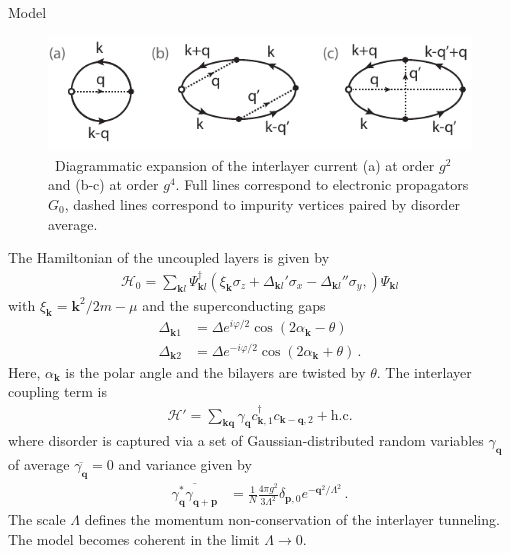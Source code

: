 \documentclass[final]{beamer}
\newlength{\onecolwid}
\begin{document}
\begin{frame}[t]
\begin{columns}[t]
\begin{column}{\onecolwid}
\begin{block}{Model}
\begin{figure}
\includegraphics[width=\linewidth]{fig/diagram-figure.pdf}
\caption{\sffamily \,
Diagrammatic expansion of the interlayer current (a) at order $g^2$ and (b-c) at
order $g^4$. Full lines correspond to electronic propagators $G_0$, dashed
lines correspond to impurity vertices paired by disorder average.}
\label{fig:diagram}
\end{figure}

The Hamiltonian of the uncoupled layers is given by
\begin{align}
	\mathcal{H}_0 = \sum_{\mathbf{k}l}\Psi_{\mathbf{k}l}^\dagger
	\left( 
	\xi_{\mathbf{k}} \sigma_z 
	+ \Delta_{\mathbf{k}l}' \sigma_x
	- \Delta_{\mathbf{k}l}'' \sigma_y,
	\right)
	\Psi_{\mathbf{k}l}
\end{align}
with $\xi_\mathbf{k} = \mathbf{k}^2/2m-\mu$ and the superconducting gaps
\begin{align}
	\Delta_{\mathbf{k}1} &= \Delta e^{i\varphi/2} \cos(2\alpha_\mathbf{k} -
	\theta) 
	\nonumber
	\\
	\Delta_{\mathbf{k}2} &= \Delta e^{-i\varphi/2} \cos(2\alpha_\mathbf{k} +
	\theta) \,.
	\label{eq:op}
\end{align}
Here, $\alpha_\mathbf{k}$ is the polar angle and the bilayers are twisted by
$\theta$. The interlayer coupling term is
\begin{align}\label{tun}
	\mathcal{H}' = \sum_{\mathbf{kq}} \gamma_{\mathbf{q}} c_{\mathbf{k},1}^\dagger
	c_{\mathbf{k-q},2} + \textrm{h.c.}
\end{align}
where disorder is captured via a set of Gaussian-distributed random variables $\gamma_\mathbf{q}$ of average $\overline{\gamma_\mathbf{q}}=0$ and variance given by
\begin{align}
	\overline{\gamma_\mathbf{q}^* \gamma_\mathbf{q+p}} &=
	\frac{1}{N}\frac{4\pi g^2}{3\Lambda^2}
	\delta_{\mathbf{p},0}e^{-\mathbf{q}^2/\Lambda^2} \,.
\end{align}
The scale $\Lambda$ defines the momentum non-conservation of the interlayer
tunneling. The model becomes coherent in the limit $\Lambda \rightarrow
0$.


\end{block}
\end{column}
\end{columns}
\end{frame}
\end{document}
